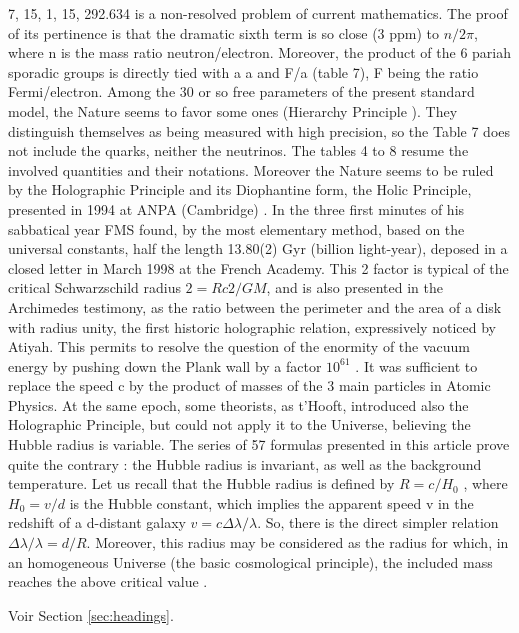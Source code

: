 \documentclass[a4paper,9pt]{article}
\begin{document}
7, 15, 1, 15, 292.634 is a non-resolved problem of current mathematics. The proof of its pertinence
is that the dramatic sixth term is so close (3 ppm) to $n/2\pi$, where n is the mass ratio
neutron/electron.
Moreover, the product of the 6 pariah sporadic groups is directly tied with a a and F/a (table 7), F
being the ratio Fermi/electron. Among the 30 or so free parameters of the present standard model,
the Nature seems to favor some ones (Hierarchy Principle \cite{Sanchez1}). They distinguish themselves as
being measured with high precision, so the Table 7 does not include the quarks, neither the neutrinos. The tables 4 to 8 resume the involved quantities and their notations. Moreover the Nature
seems to be ruled by the Holographic Principle and its Diophantine form, the Holic Principle,
presented in 1994 at ANPA (Cambridge) \cite{Sanchez3}. In the three first minutes of his sabbatical year FMS
found, by the most elementary method, based on the universal constants, half the length 13.80(2)
Gyr (billion light-year), deposed in a closed letter in March 1998 at the French Academy.
This 2 factor is typical of the critical Schwarzschild radius $2 = Rc 2 /GM$, and is also presented in
the Archimedes testimony, as the ratio between the perimeter and the area of a disk with radius
unity, the first historic holographic relation, expressively noticed by Atiyah. This permits to resolve
the question of the enormity of the vacuum energy by pushing down the Plank wall by a factor $10^{61}$
\cite{Sanchez1}. It was sufficient to replace the speed c by the product of masses of the 3 main particles in
Atomic Physics. At the same epoch, some theorists, as t'Hooft, introduced also the Holographic
Principle, but could not apply it to the Universe, believing the Hubble radius is variable.
The series of 57 formulas presented in this article prove quite the contrary : the Hubble radius is
invariant, as well as the background temperature. Let us recall that the Hubble radius is defined by
$R = c/H_0$ , where $H_0 = v/d$ is the Hubble constant, which implies the apparent speed v in the redshift
of a d-distant galaxy $v = c \Delta\lambda/\lambda$. So, there is the direct simpler relation $\Delta\lambda/\lambda = d/R$. Moreover, this
radius may be considered as the radius for which, in an homogeneous Universe (the basic
cosmological principle), the included mass reaches the above critical value \cite{Sanchez1}.

Voir Section \ref{sec:headings}.
\end{document}
